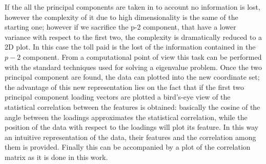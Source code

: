 \documentclass[
12pt, %
a4paper, %
oneside, %
headinclude,footinclude, %
BCOR5mm, %
]{scrartcl}
\begin{document}
If the all the principal components are taken in to account no information is lost, however the complexity of it due to high dimensionality is the same of the starting one; however if we sacrifice the p-2 component, that have a lower variance with respect to the first two, the complexity is dramatically reduced to a 2D plot. In this case the toll paid is the lost of the information contained in the $p-2$ component. From a computational point of view this task can be performed with the standard techniques used for solving a eigenvalue problem. Once the two principal component are found, the data can plotted into the new coordinate set; the advantage of this new representation lies on the fact that if the first two principal component loading vectors are plotted a bird's-eye view of the statistical correlation between the features is obtained: basically the cosine of the angle between the loadings approximates the statistical correlation, while the position of the data with respect to the loadings will plot its feature. In this way an intuitive representation of the data, their features and the correlation among them is provided. Finally this can be accompanied by a plot of the correlation matrix as it is done in this work. 













\renewcommand{\refname}{\spacedlowsmallcaps{References}} %




\end{document}

